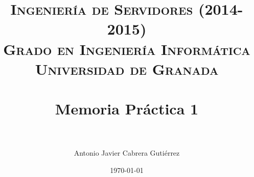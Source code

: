 


\title{	
\normalfont \normalsize 
\textsc{{\bf Ingeniería de Servidores (2014-2015)} \\ Grado en Ingeniería Informática \\ Universidad de Granada} \\ [25pt] %
\horrule{0.5pt} \\[0.4cm] %
\huge Memoria Práctica 1 \\ %
\horrule{2pt} \\[0.5cm] %
}

\author{Antonio Javier Cabrera Gutiérrez } %

\date{\normalsize\today} %




\maketitle %

\newpage %

\tableofcontents %

\listoffigures

\listoftables

\newpage

